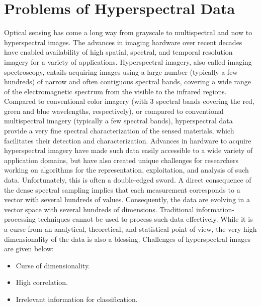 \documentclass[document.tex]{subfiles}
\begin{document}
\section{Problems of Hyperspectral Data}
 \noindent Optical sensing has come a long way from grayscale to multispectral and now to hyperspectral images. The advances in imaging hardware over recent decades have enabled availability of high spatial, spectral, and temporal resolution imagery for a variety of applications. Hyperspectral imagery, also
called imaging spectroscopy, entails acquiring images using a
large number (typically a few hundreds) of narrow and often
contiguous spectral bands, covering a wide range of the electromagnetic spectrum from the visible to the infrared regions.
Compared to conventional color imagery (with 3 spectral bands
covering the red, green and blue wavelengths, respectively),
or compared to conventional multispectral imagery (typically
a few spectral bands), hyperspectral data provide a very fine
spectral characterization of the sensed materials, which facilitates their detection and characterization.
Advances in hardware to acquire hyperspectral imagery have
made such data easily accessible to a wide variety of application domains, but have also created unique challenges for
researchers working on algorithms for the representation, exploitation, and analysis of such data. Unfortunately, this is often
a double-edged sword. A direct consequence of the dense spectral sampling implies that each measurement corresponds to a
vector with several hundreds of values. Consequently, the data
are evolving in a vector space with several hundreds of dimensions. Traditional information-processing techniques cannot be
used to process such data effectively. While it is a curse from an
analytical, theoretical, and statistical point of view, the very high
dimensionality of the data is also a blessing. Challenges of hyperspectral images are given below:
\begin{itemize}
	\item Curse of dimensionality.
	\item High correlation.
	\item Irrelevant information for classification.
\end{itemize}
\end{document}
